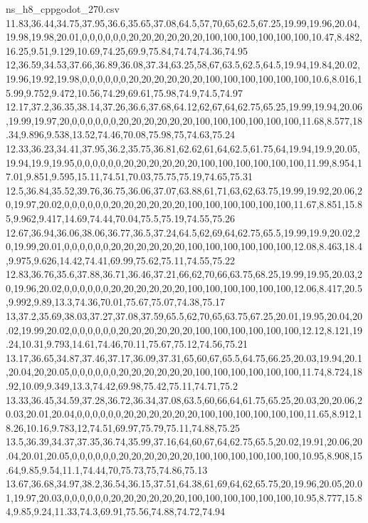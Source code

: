 \begin{filecontents*}[overwrite]{ns_h8_cppgodot_270.csv}
11.83,36.44,34.75,37.95,36.6,35.65,37.08,64.5,57,70,65,62.5,67.25,19.99,19.96,20.04,19.98,19.98,20.01,0,0,0,0,0,0,20,20,20,20,20,20,100,100,100,100,100,100,10.47,8.482,16.25,9.51,9.129,10.69,74.25,69.9,75.84,74.74,74.36,74.95
12,36.59,34.53,37.66,36.89,36.08,37.34,63.25,58,67,63.5,62.5,64.5,19.94,19.84,20.02,19.96,19.92,19.98,0,0,0,0,0,0,20,20,20,20,20,20,100,100,100,100,100,100,10.6,8.016,15.99,9.752,9.472,10.56,74.29,69.61,75.98,74.9,74.5,74.97
12.17,37.2,36.35,38.14,37.26,36.6,37.68,64.12,62,67,64,62.75,65.25,19.99,19.94,20.06,19.99,19.97,20,0,0,0,0,0,0,20,20,20,20,20,20,100,100,100,100,100,100,11.68,8.577,18.34,9.896,9.538,13.52,74.46,70.08,75.98,75,74.63,75.24
12.33,36.23,34.41,37.95,36.2,35.75,36.81,62.62,61,64,62.5,61.75,64,19.94,19.9,20.05,19.94,19.9,19.95,0,0,0,0,0,0,20,20,20,20,20,20,100,100,100,100,100,100,11.99,8.954,17.01,9.851,9.595,15.11,74.51,70.03,75.75,75.19,74.65,75.31
12.5,36.84,35.52,39.76,36.75,36.06,37.07,63.88,61,71,63,62,63.75,19.99,19.92,20.06,20,19.97,20.02,0,0,0,0,0,0,20,20,20,20,20,20,100,100,100,100,100,100,11.67,8.851,15.85,9.962,9.417,14.69,74.44,70.04,75.5,75.19,74.55,75.26
12.67,36.94,36.06,38.06,36.77,36.5,37.24,64.5,62,69,64,62.75,65.5,19.99,19.9,20.02,20,19.99,20.01,0,0,0,0,0,0,20,20,20,20,20,20,100,100,100,100,100,100,12.08,8.463,18.4,9.975,9.626,14.42,74.41,69.99,75.62,75.11,74.55,75.22
12.83,36.76,35.6,37.88,36.71,36.46,37.21,66,62,70,66,63.75,68.25,19.99,19.95,20.03,20,19.96,20.02,0,0,0,0,0,0,20,20,20,20,20,20,100,100,100,100,100,100,12.06,8.417,20.5,9.992,9.89,13.3,74.36,70.01,75.67,75.07,74.38,75.17
13,37.2,35.69,38.03,37.27,37.08,37.59,65.5,62,70,65,63.75,67.25,20.01,19.95,20.04,20.02,19.99,20.02,0,0,0,0,0,0,20,20,20,20,20,20,100,100,100,100,100,100,12.12,8.121,19.24,10.31,9.793,14.61,74.46,70.11,75.67,75.12,74.56,75.21
13.17,36.65,34.87,37.46,37.17,36.09,37.31,65,60,67,65.5,64.75,66.25,20.03,19.94,20.1,20.04,20,20.05,0,0,0,0,0,0,20,20,20,20,20,20,100,100,100,100,100,100,11.74,8.724,18.92,10.09,9.349,13.3,74.42,69.98,75.42,75.11,74.71,75.2
13.33,36.45,34.59,37.28,36.72,36.34,37.08,63.5,60,66,64,61.75,65.25,20.03,20,20.06,20.03,20.01,20.04,0,0,0,0,0,0,20,20,20,20,20,20,100,100,100,100,100,100,11.65,8.912,18.26,10.16,9.783,12,74.51,69.97,75.79,75.11,74.88,75.25
13.5,36.39,34.37,37.35,36.74,35.99,37.16,64,60,67,64,62.75,65.5,20.02,19.91,20.06,20.04,20.01,20.05,0,0,0,0,0,0,20,20,20,20,20,20,100,100,100,100,100,100,10.95,8.908,15.64,9.85,9.54,11.1,74.44,70,75.73,75,74.86,75.13
13.67,36.68,34.97,38.2,36.54,36.15,37.51,64.38,61,69,64,62,65.75,20,19.96,20.05,20.01,19.97,20.03,0,0,0,0,0,0,20,20,20,20,20,20,100,100,100,100,100,100,10.95,8.777,15.84,9.85,9.24,11.33,74.3,69.91,75.56,74.88,74.72,74.94

\end{filecontents*}
